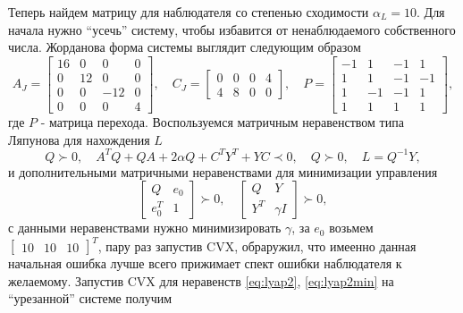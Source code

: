 Теперь найдем матрицу для наблюдателя со степенью сходимости $\alpha_L=10$. 
Для начала нужно ``усечь'' систему, чтобы избавится от ненаблюдаемого собственного
числа. Жорданова форма системы выглядит следующим образом
\begin{equation*}
    A_J=\begin{bmatrix}
        16 & 0  & 0  & 0  \\
         0 & 12 & 0  & 0  \\
         0 & 0  & -12 & 0 \\
         0 & 0  & 0  & 4
    \end{bmatrix},\quad
    C_J=\begin{bmatrix}
        0 & 0 & 0 & 4 \\
        4 & 8 & 0 & 0
    \end{bmatrix},\quad
    P=\begin{bmatrix}
        -1 &  1 & -1 &  1 \\
         1 &  1 & -1 & -1 \\
         1 & -1 & -1 &  1 \\
         1 &  1 &  1 &  1
    \end{bmatrix},
\end{equation*}
где $P$ - матрица перехода. Воспользуемся матричным неравенством типа
Ляпунова для нахождения $L$
\begin{equation}
    Q\succ0,\quad A^TQ+QA+2\alpha Q+C^TY^T+YC\prec0,\quad Q\succ0,\quad L=Q^{-1}Y,
    \label{eq:lyap2}
\end{equation}
и дополнительными матричными неравенствами для минимизации управления
\begin{equation}
    \begin{bmatrix}
        Q&e_0\\
        e_0^T&1
    \end{bmatrix}\succ0,\quad
    \begin{bmatrix}
        Q&Y\\
        Y^T&\gamma I
    \end{bmatrix}\succ0,
    \label{eq:lyap2min}
\end{equation}
с данными неравенствами нужно минимизировать $\gamma$, за $e_0$ возьмем $\begin{bmatrix}
    10&10&10
\end{bmatrix}^T$, пару раз запустив CVX, обраружил, что имеенно данная начальная ошибка
лучше всего прижимает спект ошибки наблюдателя к желаемому. Запустив CVX для неравенств
\ref{eq:lyap2}, \ref{eq:lyap2min} на ``урезанной'' системе получим
